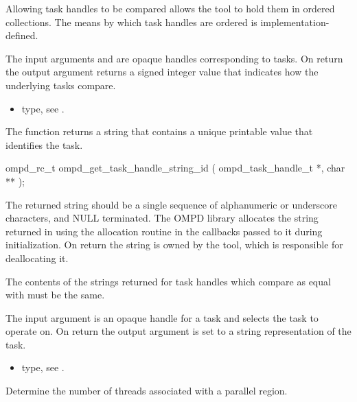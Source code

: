 Allowing task handles to be compared allows the tool to hold them in ordered collections.
The means by which task handles are ordered is implementation-defined.

\argdesc
The input arguments  and  are opaque handles 
corresponding to tasks.
On return the output argument   returns a signed 
integer value that indicates how the underlying tasks compare.

\crossreferences
\begin{itemize}
	\item {} type, see .
\end{itemize}

\label{ompd:ompd_get_task_handle_string_id}
\summary
The  function returns a string that contains a unique 
printable value that identifies the task.

\format

\cspecificstart
\begin{ompSyntax}
ompd_rc_t ompd_get_task_handle_string_id (
  ompd_task_handle_t *,
  char **
);
\end{ompSyntax}
\cspecificend


\descr
The returned string should be a single sequence of alphanumeric or underscore characters, and 
NULL terminated. The OMPD library allocates the string returned in 
using the allocation routine in the callbacks passed to it during initialization. On return the string is 
owned by the tool, which is responsible for deallocating it.

The contents of the strings returned for task handles which compare as equal with
 must be the same.

\argdesc
The input argument  is an opaque handle for a task and selects the task to operate on.
On return the output argument  is set to a string representation of the task.

\crossreferences
\begin{itemize}
	\item {} type, see .
\end{itemize}



\label{ompd:ompd_get_num_threads}
\summary
Determine the number of threads associated with a parallel region.

